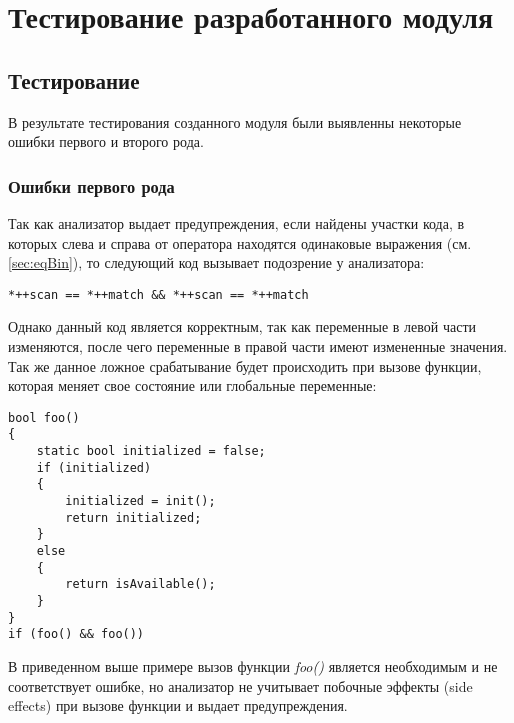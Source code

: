 \chapter{Тестирование разработанного модуля}

\section{Тестирование}
В результате тестирования созданного модуля были выявленны некоторые ошибки первого и второго рода. 

\subsection*{Ошибки первого рода}
Так как анализатор выдает предупреждения, если найдены участки кода, в которых слева и справа от оператора
находятся одинаковые выражения (см. \ref{sec:eqBin}), то следующий код вызывает подозрение у анализатора: 
\begin{lstlisting}
*++scan == *++match && *++scan == *++match
\end{lstlisting}
Однако данный код является корректным, так как переменные в левой части изменяются, после чего переменные
в правой части имеют измененные значения. Так же данное ложное срабатывание будет происходить при
вызове функции, которая меняет свое состояние или глобальные переменные:
\begin{lstlisting}
bool foo()
{
	static bool initialized = false;
	if (initialized)
	{
		initialized = init(); 
		return initialized;
	}
	else
	{
		return isAvailable();
	}		
}
if (foo() && foo())
\end{lstlisting}
В приведенном выше примере вызов функции \textit{foo()} является необходимым и не соответствует ошибке, 
но анализатор не учитывает побочные эффекты (side effects) при вызове функции и выдает предупреждения.

